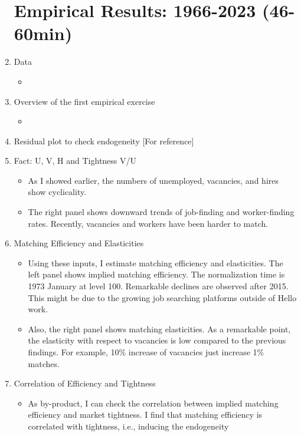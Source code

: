 \documentclass[12pt]{article}
\begin{document}
\begin{enumerate}
    \section{Empirical Results: 1966-2023 (46-60min)}
    \item Data
    \begin{itemize}
        \item 
    \end{itemize}
    \item Overview of the first empirical exercise
    \begin{itemize}
        \item 
    \end{itemize}
    \item Residual plot to check endogeneity [For reference]
    \item Fact: U, V, H and Tightness V/U
    \begin{itemize}
        \item As I showed earlier, the numbers of unemployed, vacancies, and hires show cyclicality.
        \item The right panel shows downward trends of job-finding and worker-finding rates. Recently, vacancies and workers have been harder to match.
    \end{itemize}
    \item Matching Efficiency and Elasticities
    \begin{itemize}
        \item Using these inputs, I estimate matching efficiency and elasticities. The left panel shows implied matching efficiency. The normalization time is 1973 January at level 100. Remarkable declines are observed after 2015. This might be due to the growing job searching platforms outside of Hello work.
        \item Also, the right panel shows matching elasticities. As a remarkable point, the elasticity with respect to vacancies is low compared to the previous findings. For example, 10\% increase of vacancies just increase 1\% matches.
    \end{itemize}
    \item Correlation of Efficiency and Tightness
    \begin{itemize}
        \item As by-product, I can check the correlation between implied matching efficiency and market tightness. I find that matching efficiency is correlated with tightness, i.e., inducing the endogeneity
    \end{itemize}

\end{enumerate}
\end{document}
